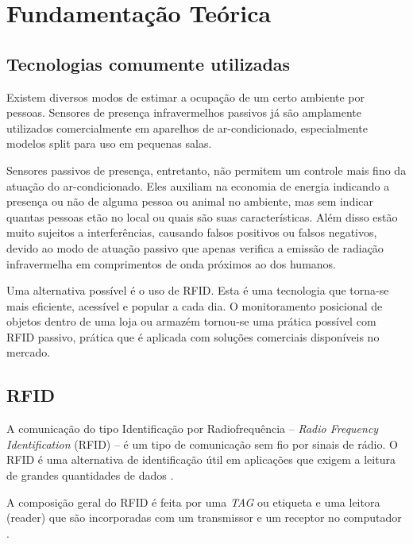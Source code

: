 
\chapter{Fundamentação Teórica\label{chap:Fundamentacao}}


\section{Tecnologias comumente utilizadas}
 
 Existem diversos modos de estimar a ocupação de um certo ambiente por pessoas. Sensores de presença infravermelhos passivos já são amplamente utilizados comercialmente em aparelhos de ar-condicionado, especialmente modelos split para uso em pequenas salas.
 
 Sensores passivos de presença, entretanto, não permitem um controle mais fino da atuação do ar-condicionado. Eles auxiliam na economia de energia indicando a presença ou não de alguma pessoa ou animal no ambiente, mas sem indicar quantas pessoas etão no local ou quais são suas características. Além disso estão muito sujeitos a interferências, causando falsos positivos ou falsos negativos, devido ao modo de atuação passivo que apenas verifica a emissão de radiação infravermelha em comprimentos de onda próximos ao dos humanos.

 Uma alternativa possível é o uso de RFID. Esta é uma tecnologia que torna-se mais eficiente, acessível e popular a cada dia. O monitoramento posicional de objetos dentro de uma loja ou armazém tornou-se uma prática possível com RFID passivo, prática que é aplicada com soluções comerciais disponíveis no mercado.
 
\section{RFID}

A comunicação do tipo Identificação por Radiofrequência – \textit{Radio Frequency Identification} (RFID) – é um tipo de comunicação sem fio por sinais de rádio. O RFID é uma alternativa de identificação útil em aplicações que exigem a leitura de grandes quantidades de dados \cite{rao1999overview}. 

A composição geral do RFID é feita por uma \textit{TAG} ou etiqueta e uma leitora (reader) que são incorporadas com um transmissor e um receptor no computador \cite{EPC-RFID-link}.

